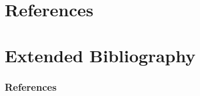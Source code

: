 {
\section{References}
\section{Extended Bibliography}
\tiny
\begin{frame}
  \frametitle{References}
  
  
\end{frame}
}

